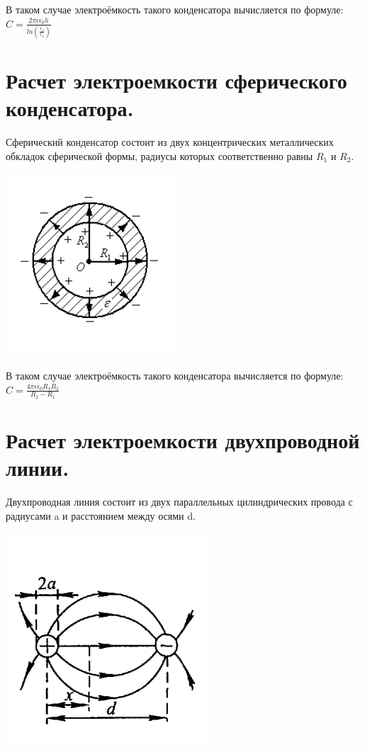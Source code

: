 \documentclass[12pt]{report}
\begin{document}
В таком случае электроёмкость такого конденсатора вычисляется по формуле: $C = \frac{2 \pi \epsilon \epsilon_0 h}{ln(\frac{r_2}{r_1})}$

\section{Расчет электроемкости сферического конденсатора.}

Сферический конденсатор состоит из двух концентрических металлических обкладок сферической формы, радиусы которых соответственно равны $R_1$ и $R_2$.

\begin{center}
    \includegraphics{graphics/t16.PNG}
\end{center}

В таком случае электроёмкость такого конденсатора вычисляется по формуле: $C = \frac{4 \pi \epsilon \epsilon_0 R_1 R_2}{R_2 - R_1}$

\section{Расчет электроемкости двухпроводной линии.}

Двухпроводная линия состоит из двух параллельных цилиндрических провода с радиусами a и расстоянием между осями d.

\begin{center}
    \includegraphics{graphics/t17.PNG}
\end{center}
\end{document}
